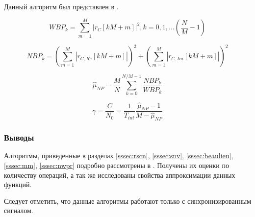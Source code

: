 Данный алгоритм был представлен в \cite{parkinson_1996}.

\begin{center}
\begin{equation}
	WBP_k = \sum \limits_{m=1}^{M} \left|r_C[kM+m] \right| ^2, k=0,1,...(\frac{N}{M}-1)
\end{equation}
\end{center}

\begin{center}
\begin{equation}
	NBP_k = (\sum \limits_{m=1}^{M} \left|r_{C,Re}[kM+m] \right| )^2 + (\sum \limits_{m=1}^{M} \left|r_{C,Im}[kM+m] \right| )^2
\end{equation}
\end{center}

\begin{center}
\begin{equation}
	\hat \mu_{NP} = \frac{M}{N} \sum \limits_{k=0}^{N/M-1} \frac{NBP_k}{WBP_k}
\end{equation}
\end{center}

\begin{center}
\begin{equation}
	\gamma = \frac{C}{N_0} = \frac{1}{T_{int}} \frac{\hat \mu_{NP} - 1}{M - \hat \mu_{NP}}
\end{equation}
\end{center}

\subsubsection{Выводы}
Алгоритмы, приведенные в разделах \ref{sssec:rscn}, \ref{sssec:snv}, \ref{sssec:beaulieu}, \ref{sssec:mm}, \ref{sssec:nwpr}
подробно рассмотрены в \cite{presti_ieee}. Получены их оценки по количеству операций, а так же
исследованы свойства аппроксимации данных функций.

Следует отметить, что данные алгоритмы работают только с синхронизированным сигналом.

\newpage
